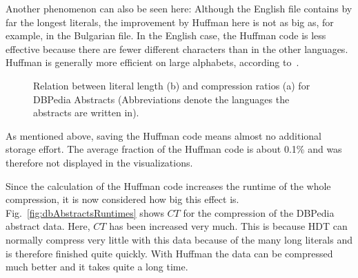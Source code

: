 Another phenomenon can also be seen here: Although the English file contains by far the longest literals, the improvement by Huffman here is not as big as, for example, in the Bulgarian file. In the English case, the Huffman code is less effective because there are fewer different characters than in the other languages. Huffman is generally more efficient on large alphabets, according to~\cite{huffman}.

\begin{figure}[h]
	\centering
	\hfill
	\caption{Relation between literal length (b) and compression ratios (a) for DBPedia Abstracts (Abbreviations denote the languages the abstracts are written in).}
	\label{fig:dbAbstracts}
\end{figure}

As mentioned above, saving the Huffman code means almost no additional storage effort. The average fraction of the Huffman code is about 0.1\% and was therefore not displayed in the visualizations.

Since the calculation of the Huffman code increases the runtime of the whole compression, it is now considered how big this effect is. Fig.~\ref{fig:dbAbstractsRuntimes} shows $CT$ for the compression of the DBPedia abstract data. Here, $CT$ has been increased very much. This is because HDT can normally compress very little with this data because of the many long literals and is therefore finished quite quickly. With Huffman the data can be compressed much better and it takes quite a long time.

